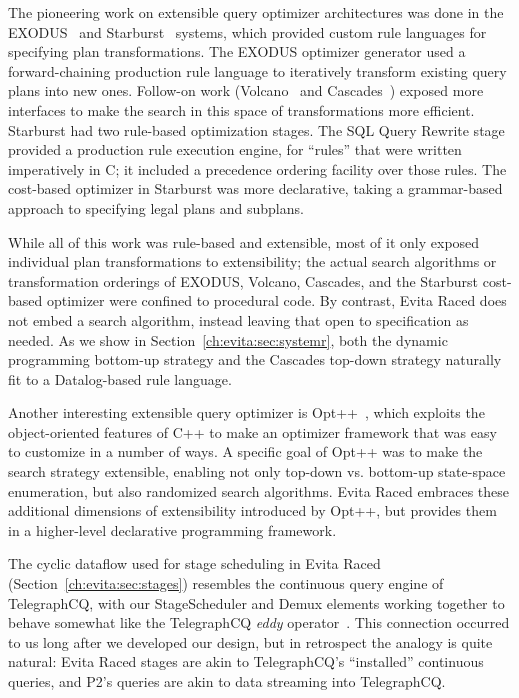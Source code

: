 The pioneering work on extensible query optimizer architectures was done in the
EXODUS~\cite{exodus} and Starburst~\cite{lohman,phh92} systems, which provided
custom rule languages for specifying plan transformations.  The EXODUS
optimizer generator used a forward-chaining production rule language to iteratively
transform existing query plans into new ones.  Follow-on work
(Volcano~\cite{volcano} and Cascades~\cite{cascades}) exposed more interfaces
to make the search in this space of transformations more efficient.  Starburst
had two rule-based optimization stages.  The SQL Query Rewrite stage provided a
production rule execution engine, for ``rules'' that were written imperatively
in C; it included a precedence ordering facility over those rules.  The
cost-based optimizer in Starburst was more declarative, taking a grammar-based
approach to specifying legal plans and subplans.

While all of this work was rule-based and extensible, most of it only exposed
individual plan transformations to extensibility; the actual search algorithms
or transformation orderings of EXODUS, Volcano, Cascades, and the Starburst
cost-based optimizer were confined to procedural code.  By contrast, Evita Raced
does not embed a search algorithm, instead leaving that open to specification
as needed.  As we show in Section~\ref{ch:evita:sec:systemr}, both the dynamic programming
bottom-up strategy and the Cascades top-down strategy naturally fit to a
Datalog-based rule language.

Another interesting extensible query optimizer is Opt++~\cite{kabradewitt},
which exploits the object-oriented features of C++ to make an optimizer
framework that was easy to customize in a number of ways.  A specific goal of
Opt++ was to make the search strategy extensible, enabling not only top-down
vs.  bottom-up state-space enumeration, but also randomized search algorithms.
Evita Raced embraces these additional dimensions of extensibility introduced by
Opt++, but provides them in a higher-level declarative programming framework.

The cyclic dataflow used for stage scheduling in Evita Raced
(Section~\ref{ch:evita:sec:stages}) resembles the continuous query engine of
TelegraphCQ, with our StageScheduler and Demux elements working together to
behave somewhat like the TelegraphCQ {\em eddy} operator~\cite{tcq-cidr}.  This
connection occurred to us long after we developed our design, but in retrospect
the analogy is quite natural: Evita Raced stages are akin to TelegraphCQ's
``installed'' continuous queries, and P2's \OVERLOG queries are akin to data
streaming into TelegraphCQ.

